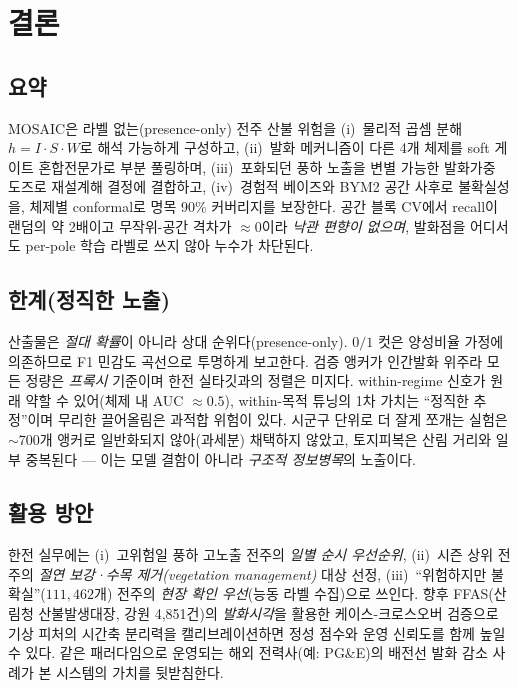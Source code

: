 \documentclass[11pt,a4paper]{article}
\begin{document}
\section{결론}

\subsection{요약}
MOSAIC은 라벨 없는(presence-only) 전주 산불 위험을 (i)~물리적 곱셈 분해 $h=I\cdot S\cdot W$로
해석 가능하게 구성하고, (ii)~발화 메커니즘이 다른 4개 체제를 soft 게이트 혼합전문가로 부분 풀링하며,
(iii)~포화되던 풍하 노출을 변별 가능한 발화가중 도즈로 재설계해 결정에 결합하고, (iv)~경험적 베이즈와
BYM2 공간 사후로 불확실성을, 체제별 conformal로 명목 90\% 커버리지를 보장한다. 공간 블록 CV에서
recall이 랜덤의 약 2배이고 무작위-공간 격차가 $\approx 0$이라 \emph{낙관 편향이 없으며}, 발화점을
어디서도 per-pole 학습 라벨로 쓰지 않아 누수가 차단된다.

\subsection{한계(정직한 노출)}
산출물은 \emph{절대 확률}이 아니라 상대 순위다(presence-only). $0/1$ 컷은 양성비율 가정에 의존하므로
F1 민감도 곡선으로 투명하게 보고한다. 검증 앵커가 인간발화 위주라 모든 정량은 \emph{프록시} 기준이며
한전 실타깃과의 정렬은 미지다. within-regime 신호가 원래 약할 수 있어(체제 내 AUC $\approx 0.5$),
within-목적 튜닝의 1차 가치는 ``정직한 추정''이며 무리한 끌어올림은 과적합 위험이 있다. 시군구 단위로
더 잘게 쪼개는 실험은 $\sim$700개 앵커로 일반화되지 않아(과세분) 채택하지 않았고, 토지피복은 산림
거리와 일부 중복된다 --- 이는 모델 결함이 아니라 \emph{구조적 정보병목}의 노출이다.

\subsection{활용 방안}
한전 실무에는 (i)~고위험일 풍하 고노출 전주의 \emph{일별 순시 우선순위}, (ii)~시즌 상위 전주의
\emph{절연 보강·수목 제거(vegetation management)} 대상 선정, (iii)~``위험하지만 불확실''($111{,}462$개)
전주의 \emph{현장 확인 우선}(능동 라벨 수집)으로 쓰인다. 향후 FFAS(산림청 산불발생대장, 강원 4{,}851건)의
\emph{발화시각}을 활용한 케이스-크로스오버 검증으로 기상 피처의 시간축 분리력을 캘리브레이션하면 정성
점수와 운영 신뢰도를 함께 높일 수 있다. 같은 패러다임으로 운영되는 해외 전력사(예: PG\&E)의 배전선
발화 감소 사례가 본 시스템의 가치를 뒷받침한다.
\end{document}
